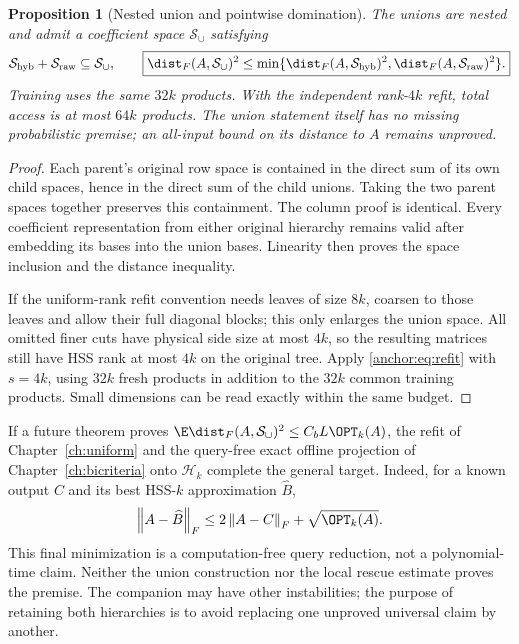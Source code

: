 \documentclass[11pt,oneside,openany,a4paper]{book}
\numberwithin{equation}{chapter}
\newtheorem{proposition}[theorem]{Proposition}
\theoremstyle{definition}
\theoremstyle{remark}
\newcommand{\F}[1]{\left\lVert#1\right\rVert_F}
\newcommand{\HH}{\mathcal H}\newcommand{\SSS}{\mathcal S}
\begin{document}
\begin{proposition}[Nested union and pointwise domination]\label{anchor:prop:union}
The unions are nested and admit a coefficient space $\SSS_\cup$ satisfying
\begin{equation}\label{anchor:eq:union}
 \SSS_{\rm hyb}+\SSS_{\rm raw}\subseteq\SSS_\cup,\qquad
 \boxed{\dist_F(A,\SSS_\cup)^2
 \le\min\{\dist_F(A,\SSS_{\rm hyb})^2,
          \dist_F(A,\SSS_{\rm raw})^2\}.}
\end{equation}
Training uses the same $32k$ products. With the independent rank-$4k$ refit, total access is at most $64k$ products. The union statement itself has no missing probabilistic premise; an all-input bound on its distance to $A$ remains unproved.
\end{proposition}
\begin{proof}
Each parent's original row space is contained in the direct sum of its own child spaces, hence in the direct sum of the child unions. Taking the two parent spaces together preserves this containment. The column proof is identical. Every coefficient representation from either original hierarchy remains valid after embedding its bases into the union bases. Linearity then proves the space inclusion and the distance inequality.

If the uniform-rank refit convention needs leaves of size $8k$, coarsen to those leaves and allow their full diagonal blocks; this only enlarges the union space. All omitted finer cuts have physical side size at most $4k$, so the resulting matrices still have HSS rank at most $4k$ on the original tree. Apply \eqref{anchor:eq:refit} with $s=4k$, using $32k$ fresh products in addition to the $32k$ common training products. Small dimensions can be read exactly within the same budget.
\end{proof}

If a future theorem proves $\E\dist_F(A,\SSS_\cup)^2\le C_bL\OPT_k(A)$, the refit of Chapter~\ref{ch:uniform} and the query-free exact offline projection of Chapter~\ref{ch:bicriteria} onto $\HH_k$ complete the general target. Indeed, for a known output $C$ and its best HSS-$k$ approximation $\widehat B$,
\[
 \F{A-\widehat B}\le2\F{A-C}+\sqrt{\OPT_k(A)}.
\]
This final minimization is a computation-free query reduction, not a polynomial-time claim. Neither the union construction nor the local rescue estimate proves the premise. The companion may have other instabilities; the purpose of retaining both hierarchies is to avoid replacing one unproved universal claim by another.
\end{document}

